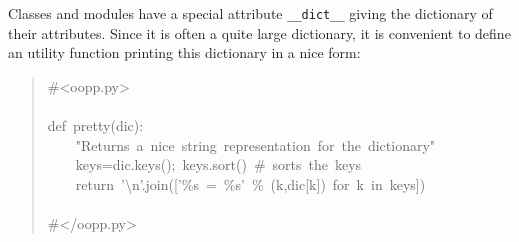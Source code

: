 \documentclass[10pt,english]{article}
\begin{document}
Classes and modules have a special attribute \texttt{{\_}{\_}dict{\_}{\_}} giving the 
dictionary of their attributes. Since it is often a quite large dictionary, 
it is convenient to define an utility function printing this dictionary in a 
nice form:
\begin{quote}
\begin{ttfamily}\begin{flushleft}
\mbox{{\#}<oopp.py>}\\
\mbox{}\\
\mbox{def~pretty(dic):}\\
\mbox{~~~~"Returns~a~nice~string~representation~for~the~dictionary"}\\
\mbox{~~~~keys=dic.keys();~keys.sort()~{\#}~sorts~the~keys}\\
\mbox{~~~~return~'{\textbackslash}n'.join(['{\%}s~=~{\%}s'~{\%}~(k,dic[k])~for~k~in~keys])}\\
\mbox{}\\
\mbox{{\#}</oopp.py>}
\end{flushleft}\end{ttfamily}
\end{quote}
\end{document}
